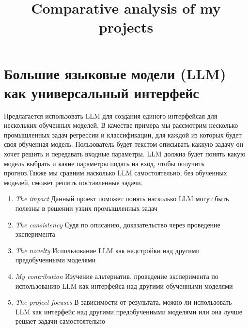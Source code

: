 \documentclass[12pt]{article}
\title{Comparative analysis of my projects}
\date{}
\begin{document}
\maketitle

\section{Большие языковые модели (LLM) как универсальный интерфейс}
Предлагается использовать LLM для создания единого интерфейсая для нескольких обученных моделей. 
В качестве примера мы рассмотрим несколько промышленных задач регрессии и классификации, для каждой из которых будет своя обученная модель. Пользователь будет текстом описывать каккую задачу он хочет решить и передавать входные параметры. LLM должна будет понять какую модель выбрать и какие параметры подать на вход, чтобы получить прогноз.Также мы сравним насколько LLM самостоятельно, без обученных моделей, сможет решить поставленные задачи. 
 
\begin{enumerate}
\item \emph{The impact} Данный проект поможет понять насколько LLM могут быть полезны в решении узких промышленных задач
\item \emph{The consistency} Судя по описанию, доказательство через проведение эксперимента
\item \emph{The novelty} Использование LLM как надстройки над другими предобученными моделями
\item \emph{My contribution} Изучение альтернатив, проведение эксперимента по использованию LLM как интерфейса над другими обученными моделями
\item \emph{The project focuses}  В зависимости от результата, можно ли использовать LLM как интерфейс над другими предобученными моделями или она лучше решает задачи самостоятельно 
\end{enumerate}
\end{document}
